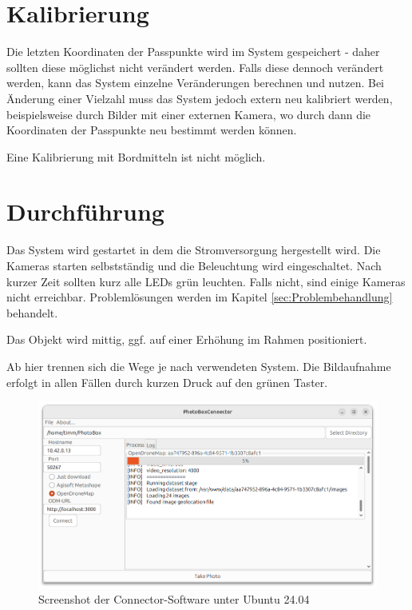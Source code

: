 \documentclass[./00PhotoBox.tex]{subfiles}
\begin{document}
\section{Kalibrierung}
Die letzten Koordinaten der Passpunkte wird im System gespeichert - daher sollten diese möglichst nicht verändert werden. Falls diese dennoch verändert werden, kann das System einzelne Veränderungen berechnen und nutzen. Bei Änderung einer Vielzahl muss das System jedoch extern neu kalibriert werden, beispielsweise durch Bilder mit einer externen Kamera, wo durch dann die Koordinaten der Passpunkte neu bestimmt werden können.

Eine Kalibrierung mit Bordmitteln ist nicht möglich.

\section{Durchführung}
Das System wird gestartet in dem die Stromversorgung hergestellt wird. Die Kameras starten selbstständig und die Beleuchtung wird eingeschaltet. Nach kurzer Zeit sollten kurz alle LEDs grün leuchten. Falls nicht, sind einige Kameras nicht erreichbar. Problemlösungen werden im Kapitel \autoref{sec:Problembehandlung} behandelt.

Das Objekt wird mittig, ggf. auf einer Erhöhung im Rahmen positioniert.

Ab hier trennen sich die Wege je nach verwendeten System. Die Bildaufnahme erfolgt in allen Fällen durch kurzen Druck auf den grünen Taster.

\begin{figure}
    \centering
    \includegraphics[width=1\textwidth]{./img/connector_screenshot.png}
    \caption{Screenshot der Connector-Software unter Ubuntu 24.04} %
    \label{img:connector} %
\end{figure}
\end{document}
